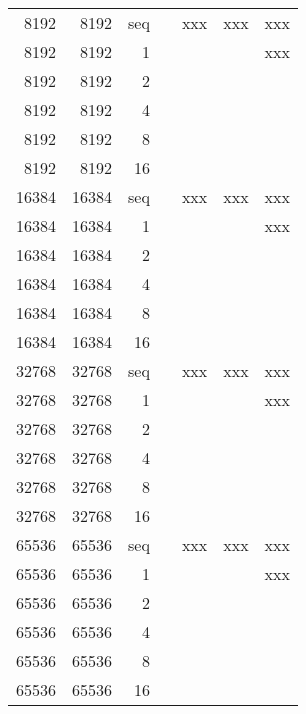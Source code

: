 \begin{center}
\begin{tabular}{ | r | r | r | r | r | r | r |}
	8192    &	8192    &	seq	&				&	xxx		&	xxx	&	xxx \\
    8192   	&	8192   	&	1	&	 	 		&			&		&	xxx \\
    8192   	&	8192   	&	2	&	 	 	 	&			&		&\\
    8192   	&	8192   	&	4	&	 	 	 	&			&		&\\
    8192   	&	8192   	&	8	&	 	 	 	&			&		&\\
    8192   	&	8192   	&	16	&	 	 	 	&			&		&\\
                        
	16384   &	16384   &	seq	&				&	xxx		&	xxx	&	xxx \\
    16384  	&	16384  	&	1	&	 	 		&			&		&	xxx \\
    16384  	&	16384  	&	2	&	 	 	 	&			&		&\\
    16384  	&	16384  	&	4	&	 	 	 	&			&		&\\
    16384  	&	16384  	&	8	&	 	 	 	&			&		&\\
    16384  	&	16384  	&	16	&	 	 	 	&			&		&\\
	            
	32768   &	32768   &	seq	&				&	xxx		&	xxx	&	xxx \\
    32768  	&	32768  	&	1	&	 	 		&			&		&	xxx \\
    32768  	&	32768  	&	2	&	 	 	 	&			&		&\\
    32768  	&	32768  	&	4	&	 	 	 	&			&		&\\
    32768  	&	32768  	&	8	&	 	 	 	&			&		&\\
    32768  	&	32768  	&	16	&	 	 	 	&			&		&\\
	            
	65536   &	65536   &	seq	&				&	xxx		&	xxx	&	xxx \\
    65536  	&	65536  	&	1	&	 	 		&			&		&	xxx \\
    65536  	&	65536  	&	2	&	 	 	 	&			&		&\\
    65536  	&	65536  	&	4	&	 	 	 	&			&		&\\
    65536  	&	65536  	&	8	&	 	 	 	&			&		&\\
    65536  	&	65536  	&	16	&	 	 	 	&			&		&\\
	\hline
	\end{tabular}
\end{center}
	
